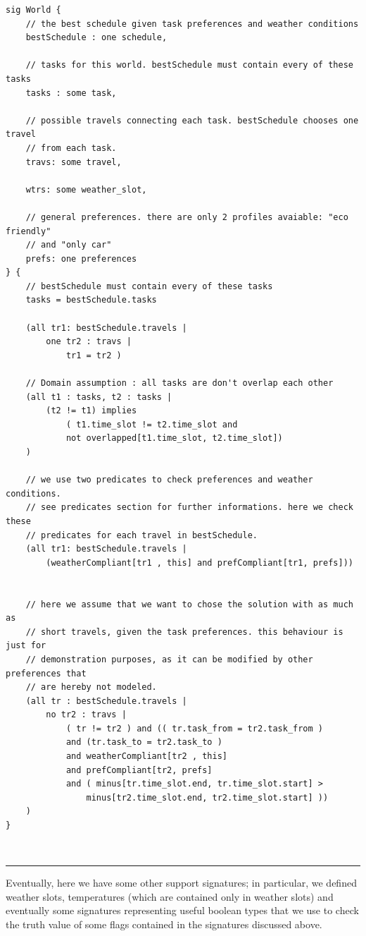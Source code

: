 \begin{verbatim}
sig World {
    // the best schedule given task preferences and weather conditions 
    bestSchedule : one schedule,
    
    // tasks for this world. bestSchedule must contain every of these tasks
    tasks : some task,
    
    // possible travels connecting each task. bestSchedule chooses one travel
    // from each task.
    travs: some travel,
    
    wtrs: some weather_slot,
    
    // general preferences. there are only 2 profiles avaiable: "eco friendly"
    // and "only car"
    prefs: one preferences
} {
    // bestSchedule must contain every of these tasks
    tasks = bestSchedule.tasks
    
    (all tr1: bestSchedule.travels | 
        one tr2 : travs | 
            tr1 = tr2 )

    // Domain assumption : all tasks are don't overlap each other
    (all t1 : tasks, t2 : tasks | 
        (t2 != t1) implies 
            ( t1.time_slot != t2.time_slot and
            not overlapped[t1.time_slot, t2.time_slot])
    ) 

    // we use two predicates to check preferences and weather conditions.
    // see predicates section for further informations. here we check these
    // predicates for each travel in bestSchedule.
    (all tr1: bestSchedule.travels | 
        (weatherCompliant[tr1 , this] and prefCompliant[tr1, prefs]))

 
    // here we assume that we want to chose the solution with as much as 
    // short travels, given the task preferences. this behaviour is just for
    // demonstration purposes, as it can be modified by other preferences that
    // are hereby not modeled.
    (all tr : bestSchedule.travels |
        no tr2 : travs | 
            ( tr != tr2 ) and (( tr.task_from = tr2.task_from )
            and (tr.task_to = tr2.task_to )
            and weatherCompliant[tr2 , this]
            and prefCompliant[tr2, prefs]
            and ( minus[tr.time_slot.end, tr.time_slot.start] >  
                minus[tr2.time_slot.end, tr2.time_slot.start] ))
    )
}
\end{verbatim}
\\
\rule{\textwidth}{0.4pt}
Eventually, here we have some other support signatures; in particular, we defined 
weather slots, temperatures (which are contained only in weather slots) and eventually some signatures representing useful boolean types that we use to check the truth value of some flags contained in the signatures discussed above.

